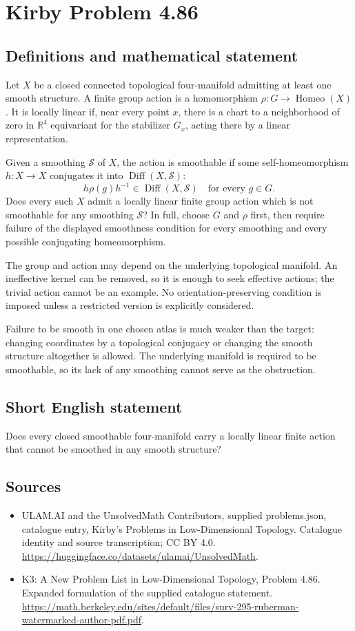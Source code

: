 \documentclass[11pt,a4paper]{article}
\begin{document}
\section*{Kirby Problem 4.86}\label{statement}

\subsection{Definitions and mathematical statement}
Let $X$ be a closed connected topological four-manifold admitting at least one smooth structure. A finite group action is a homomorphism $\rho:G\to\operatorname{Homeo}(X)$. It is locally linear if, near every point $x$, there is a chart to a neighborhood of zero in $\mathbb R^4$ equivariant for the stabilizer $G_x$, acting there by a linear representation.

Given a smoothing $\mathcal S$ of $X$, the action is smoothable if some self-homeomorphism $h:X\to X$ conjugates it into $\operatorname{Diff}(X,\mathcal S)$:
\[
h\rho(g)h^{-1}\in\operatorname{Diff}(X,\mathcal S)
\quad\text{for every }g\in G.
\]
Does every such $X$ admit a locally linear finite group action which is not smoothable for any smoothing $\mathcal S$? In full, choose $G$ and $\rho$ first, then require failure of the displayed smoothness condition for every smoothing and every possible conjugating homeomorphism.

The group and action may depend on the underlying topological manifold. An ineffective kernel can be removed, so it is enough to seek effective actions; the trivial action cannot be an example. No orientation-preserving condition is imposed unless a restricted version is explicitly considered.

Failure to be smooth in one chosen atlas is much weaker than the target: changing coordinates by a topological conjugacy or changing the smooth structure altogether is allowed. The underlying manifold is required to be smoothable, so its lack of any smoothing cannot serve as the obstruction.
\subsection{Short English statement}
Does every closed smoothable four-manifold carry a locally linear finite action that cannot be smoothed in any smooth structure?
\subsection{Sources}
\begin{itemize}
\item[S1] ULAM.AI and the UnsolvedMath Contributors, supplied problems.json, catalogue entry, Kirby's Problems in Low-Dimensional Topology. Catalogue identity and source transcription; CC BY 4.0.
\url{https://huggingface.co/datasets/ulamai/UnsolvedMath}.
\item[S2] K3: A New Problem List in Low-Dimensional Topology, Problem 4.86. Expanded formulation of the supplied catalogue statement.
\url{https://math.berkeley.edu/sites/default/files/surv-295-ruberman-watermarked-author-pdf.pdf}.
\end{itemize}
\end{document}
